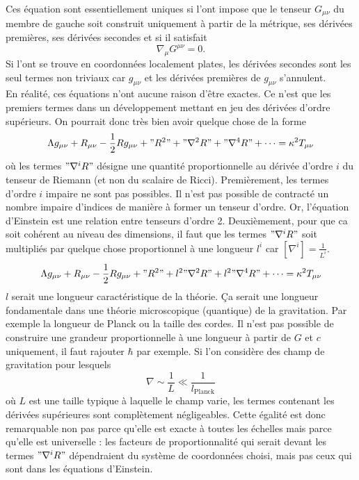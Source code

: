 \documentclass[a4paper,11pt]{report}
\begin{document}
            Ces équation sont essentiellement uniques si l'ont impose que le tenseur $G_{\mu\nu}$ du membre de gauche soit construit uniquement à partir de la métrique, ses dérivées premières, ses dérivées secondes et si il satisfait
            \begin{equation}
                \nabla_\mu G^{\mu\nu} = 0.
            \end{equation}
            Si l'ont se trouve en coordonnées localement plates, les dérivées secondes sont les seul termes non triviaux car $g_{\mu\nu}$ et les dérivées premières de $g_{\mu\nu}$ s'annulent.\\
            
            En réalité, ces équations n'ont aucune raison d'être exactes. Ce n'est que les premiers termes dans un développement mettant en jeu des dérivées d'ordre supérieurs. On pourrait donc très bien avoir quelque chose de la forme
            \begin{equation}
                \Lambda g_{\mu\nu} + R_{\mu\nu} - \frac{1}{2}Rg_{\mu\nu} + "R^2" + "\nabla^2R" + "\nabla^4 R"+\dots = \kappa^2 T_{\mu\nu}
            \end{equation}
            où les termes $"\nabla^iR"$ désigne une quantité proportionnelle au dérivée d'ordre $i$ du tenseur de Riemann (et non du scalaire de Ricci). Premièrement, les termes d'ordre $i$ impaire ne sont pas possibles. Il n'est pas possible de contracté un nombre impaire d'indices de manière à former un tenseur d'ordre. Or, l'équation d'Einstein est une relation entre tenseurs d'ordre 2. Deuxièmement, pour que ca soit cohérent au niveau des dimensions, il faut que les termes $"\nabla^i R"$ soit multipliés par quelque chose proportionnel à une longueur $l^i$ car $[\nabla^i]=\frac{1}{L^i}$.
            \begin{equation}
                \Lambda g_{\mu\nu} + R_{\mu\nu} - \frac{1}{2}Rg_{\mu\nu} + "R^2" + l^2"\nabla^2R" + l^2"\nabla^4 R"+\dots = \kappa^2 T_{\mu\nu}
            \end{equation}
            $l$ serait une longueur caractéristique de la théorie. Ça serait une longueur fondamentale dans une théorie microscopique (quantique) de la gravitation. Par exemple la longueur de Planck ou la taille des cordes. Il n'est pas possible de construire une grandeur proportionnelle à une longueur à partir de $G$ et $c$ uniquement, il faut rajouter $\hbar$ par exemple. Si l'on considère des champ de gravitation pour lesquels
            \begin{equation}
                \nabla\sim\frac{1}{L}\ll \frac{1}{l_{\text{Planck}}}
            \end{equation}
            où $L$ est une taille typique à laquelle le champ varie, les termes contenant les dérivées supérieures sont complètement négligeables. Cette égalité est donc remarquable non pas parce qu'elle est exacte à toutes les échelles mais parce qu'elle est universelle : les facteurs de proportionnalité qui serait devant les termes $"\nabla^iR"$ dépendraient du système de coordonnées choisi, mais pas ceux qui sont dans les équations d'Einstein.\\
            
\end{document}
